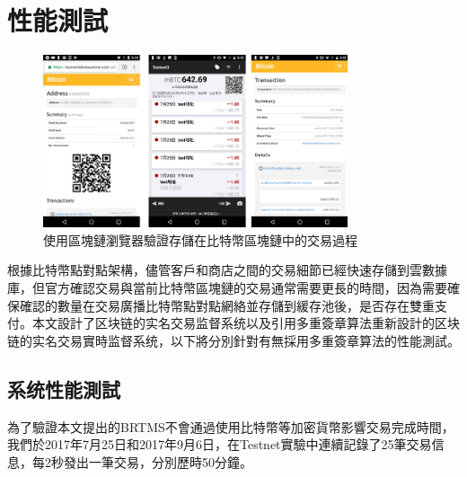 	\section{性能測試}
		\begin{figure}[htbp]
			\centering
			\includegraphics[width = 0.8\textwidth]{fig9.png}
			\caption{使用區塊鏈瀏覽器驗證存儲在比特幣區塊鏈中的交易過程}\label{fig9}
		\end{figure}

		根據比特幣點對點架構，儘管客戶和商店之間的交易細節已經快速存儲到雲數據庫，但官方確認交易與當前比特幣區塊鏈的交易通常需要更長的時間，因為需要確保確認的數量在交易廣播比特幣點對點網絡並存儲到緩存池後，是否存在雙重支付。本文設計了区块链的实名交易监督系统以及引用多重簽章算法重新設計的区块链的实名交易實時监督系统，以下將分別針對有無採用多重簽章算法的性能測試。


		\subsection{系统性能測試}
		為了驗證本文提出的BRTMS不會通過使用比特幣等加密貨幣影響交易完成時間，我們於2017年7月25日和2017年9月6日，在Testnet實驗中連續記錄了25筆交易信息，每2秒發出一筆交易，分別歷時50分鐘。

